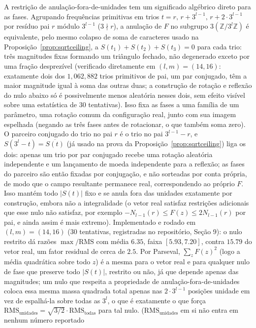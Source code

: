 \documentclass[11pt]{amsart}
\theoremstyle{plain}
\theoremstyle{definition}
\theoremstyle{remark}
\newcommand{\Z}{\mathbb{Z}}
\begin{document}
A restrição de anulação-fora-de-unidades tem um significado algébrico direto para as fases.
Agrupando frequências primitivas em trios $t=r,\,r+3^{l-1},\,r+2\cdot3^{l-1}$ por resíduo pai $r$
módulo $3^{l-1}$ ($3\nmid r$), a anulação de $F$ no subgrupo $3(\Z/3^l\Z)$ é equivalente, pelo
mesmo colapso de soma de caracteres usado na Proposição~\ref{prop:sqrtceiling}, a
$S(t_1)+S(t_2)+S(t_3)=0$ para cada trio: três magnitudes fixas formando um triângulo fechado, não
degenerado exceto por uma fração desprezível (verificado diretamente em $(l,m)=(14,16)$: exatamente
dois dos $1{,}062{,}882$ trios primitivos de pai, um par conjugado, têm a maior magnitude igual à
soma das outras duas; a construção de rotação e reflexão do nulo abaixo só é possivelmente menos
aleatória nesses dois, sem efeito visível sobre uma estatística de $30$ tentativas). Isso fixa as
fases a uma família de um parâmetro, uma rotação comum da configuração real, junto com sua imagem
espelhada (negando as três fases antes de rotacionar, o que também soma zero). O parceiro conjugado
do trio no pai $r$ é o trio no pai $3^{l-1}-r$, e $S(3^l-t)=\overline{S(t)}$ (já usado na prova da
Proposição~\ref{prop:sqrtceiling}) liga os dois: apenas um trio por par conjugado recebe uma
rotação aleatória independente e um lançamento de moeda independente para a reflexão; as fases do
parceiro são então fixadas por conjugação, e não sorteadas por conta própria, de modo que o campo
resultante permanece real, correspondendo ao próprio $F$. Isso mantém todo $|S(t)|$ fixo e se anula
fora das unidades exatamente por construção, embora não a integralidade (o vetor real satisfaz
restrições adicionais que esse nulo não satisfaz, por exemplo $-N_{l-1}(r)\le F(z)\le2N_{l-1}(r)$
por pai, e ainda assim é mais extremo). Implementado e rodado em $(l,m)=(14,16)$ (30 tentativas,
registradas no repositório, Seção 9): o nulo restrito dá razões $\max/\mathrm{RMS}$ com média
$6.35$, faixa $[5.93,7.20]$, contra $15.79$ do vetor real, um fator residual de cerca de $2.5$. Por
Parseval, $\sum_z F(z)^2$ (logo a média quadrática sobre todo $z$) é a mesma para o vetor real e
para qualquer nulo de fase que preserve todo $|S(t)|$, restrito ou não, já que depende apenas das
magnitudes; um nulo que respeita a propriedade de anulação-fora-de-unidades coloca essa mesma massa
quadrada total apenas nas $2\cdot3^{l-1}$ posições unidade em vez de espalhá-la sobre todas as
$3^l$, o que é exatamente o que força $\mathrm{RMS}_{\mathrm{unidades}}=\sqrt{3/2}\cdot\mathrm{RMS}_{\mathrm{todas}}$
para tal nulo. ($\mathrm{RMS}_{\mathrm{unidades}}$ em si não entra em nenhum número reportado
\end{document}
